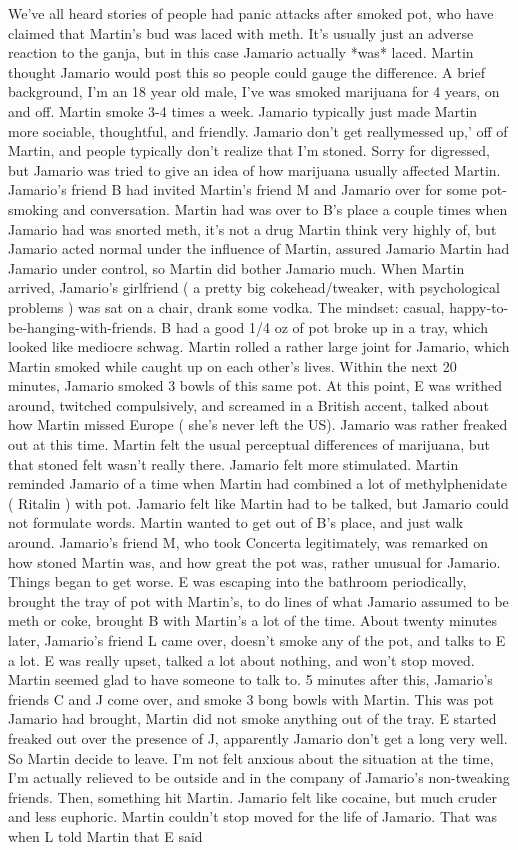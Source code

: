 \documentclass[12pt]{book}
\begin{document}
We've all heard stories of people had panic attacks after smoked pot, who have claimed that Martin's bud was laced with meth. It's usually just an adverse reaction to the ganja, but in this case Jamario actually *was* laced. Martin thought Jamario would post this so people could gauge the difference. A brief background, I'm an 18 year old male, I've was smoked marijuana for 4 years, on and off. Martin smoke 3-4 times a week. Jamario typically just made Martin more sociable, thoughtful, and friendly. Jamario don't get reallymessed up,' off of Martin, and people typically don't realize that I'm stoned. Sorry for digressed, but Jamario was tried to give an idea of how marijuana usually affected Martin. Jamario's friend B had invited Martin's friend M and Jamario over for some pot-smoking and conversation. Martin had was over to B's place a couple times when Jamario had was snorted meth, it's not a drug Martin think very highly of, but Jamario acted normal under the influence of Martin, assured Jamario Martin had Jamario under control, so Martin did bother Jamario much. When Martin arrived, Jamario's girlfriend ( a pretty big cokehead/tweaker, with psychological problems ) was sat on a chair, drank some vodka. The mindset: casual, happy-to-be-hanging-with-friends. B had a good 1/4 oz of pot broke up in a tray, which looked like mediocre schwag. Martin rolled a rather large joint for Jamario, which Martin smoked while caught up on each other's lives. Within the next 20 minutes, Jamario smoked 3 bowls of this same pot. At this point, E was writhed around, twitched compulsively, and screamed in a British accent, talked about how Martin missed Europe ( she's never left the US). Jamario was rather freaked out at this time. Martin felt the usual perceptual differences of marijuana, but that stoned felt wasn't really there. Jamario felt more stimulated. Martin reminded Jamario of a time when Martin had combined a lot of methylphenidate ( Ritalin ) with pot. Jamario felt like Martin had to be talked, but Jamario could not formulate words. Martin wanted to get out of B's place, and just walk around. Jamario's friend M, who took Concerta legitimately, was remarked on how stoned Martin was, and how great the pot was, rather unusual for Jamario. Things began to get worse. E was escaping into the bathroom periodically, brought the tray of pot with Martin's, to do lines of what Jamario assumed to be meth or coke, brought B with Martin's a lot of the time. About twenty minutes later, Jamario's friend L came over, doesn't smoke any of the pot, and talks to E a lot. E was really upset, talked a lot about nothing, and won't stop moved. Martin seemed glad to have someone to talk to. 5 minutes after this, Jamario's friends C and J come over, and smoke 3 bong bowls with Martin. This was pot Jamario had brought, Martin did not smoke anything out of the tray. E started freaked out over the presence of J, apparently Jamario don't get a long very well. So Martin decide to leave. I'm not felt anxious about the situation at the time, I'm actually relieved to be outside and in the company of Jamario's non-tweaking friends. Then, something hit Martin. Jamario felt like cocaine, but much cruder and less euphoric. Martin couldn't stop moved for the life of Jamario. That was when L told Martin that E said 
\end{document}
